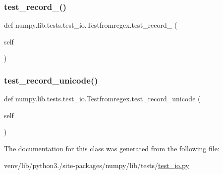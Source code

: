 \subsubsection{\texorpdfstring{test\+\_\+record\+\_()}{test\_record\_3()}}
{\footnotesize\ttfamily def numpy.\+lib.\+tests.\+test\+\_\+io.\+Testfromregex.\+test\+\_\+record\+\_ (\begin{DoxyParamCaption}\item[{}]{self }\end{DoxyParamCaption})}

\mbox{\label{classnumpy_1_1lib_1_1tests_1_1test__io_1_1Testfromregex_a3af9c8860c90c108b223aaa730a2704c}} 
\subsubsection{\texorpdfstring{test\+\_\+record\+\_\+unicode()}{test\_record\_unicode()}}
{\footnotesize\ttfamily def numpy.\+lib.\+tests.\+test\+\_\+io.\+Testfromregex.\+test\+\_\+record\+\_\+unicode (\begin{DoxyParamCaption}\item[{}]{self }\end{DoxyParamCaption})}



The documentation for this class was generated from the following file\+:\begin{DoxyCompactItemize}
\item 
venv/lib/python3./site-\/packages/numpy/lib/tests/\hyperlink{test__io_8py}{test\+\_\+io.\+py}\end{DoxyCompactItemize}
